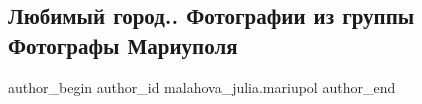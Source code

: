  
 
 
 
 

\subsection{Любимый город.. Фотографии из группы Фотографы Мариуполя}
\label{sec:26_12_2022.fb.malahova_julia.mariupol.1.lyubimii_gorod__foto}

\ifcmt
 author_begin
   author_id malahova_julia.mariupol
 author_end
\fi
